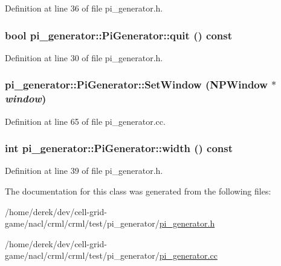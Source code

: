 Definition at line 36 of file pi\_\-generator.h.

\hypertarget{classpi__generator_1_1_pi_generator_a02e8796485d878cbe8a42dcc2b204c4a}{
\subsubsection[{quit}]{\setlength{\rightskip}{0pt plus 5cm}bool pi\_\-generator::PiGenerator::quit () const}}
\label{classpi__generator_1_1_pi_generator_a02e8796485d878cbe8a42dcc2b204c4a}


Definition at line 30 of file pi\_\-generator.h.

\hypertarget{classpi__generator_1_1_pi_generator_ad19c9de44971a5c08ee8e26a45598f38}{
\subsubsection[{SetWindow}]{ pi\_\-generator::PiGenerator::SetWindow ({\bf NPWindow} $\ast$ {\em window})}}
\label{classpi__generator_1_1_pi_generator_ad19c9de44971a5c08ee8e26a45598f38}


Definition at line 65 of file pi\_\-generator.cc.

\hypertarget{classpi__generator_1_1_pi_generator_ae3b2d276f4cf6209d7653f6fc4437fc4}{
\subsubsection[{width}]{\setlength{\rightskip}{0pt plus 5cm}int pi\_\-generator::PiGenerator::width () const}}
\label{classpi__generator_1_1_pi_generator_ae3b2d276f4cf6209d7653f6fc4437fc4}


Definition at line 39 of file pi\_\-generator.h.



The documentation for this class was generated from the following files:\begin{DoxyCompactItemize}
\item 
/home/derek/dev/cell-\/grid-\/game/nacl/crml/crml/test/pi\_\-generator/\hyperlink{pi__generator_8h}{pi\_\-generator.h}\item 
/home/derek/dev/cell-\/grid-\/game/nacl/crml/crml/test/pi\_\-generator/\hyperlink{pi__generator_8cc}{pi\_\-generator.cc}\end{DoxyCompactItemize}
